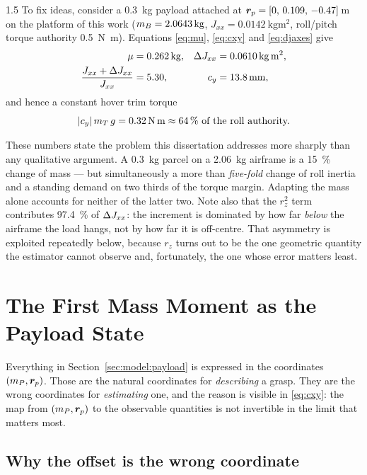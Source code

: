 \begin{spacing}{1.5}
To fix ideas, consider a \SI{0.3}{\kg} payload attached at
$\bm{r}_p = [0,\, 0.109,\, -0.47]\,$\si{\meter} on the platform of this work
($\mB = \SI{2.0643}{\kg}$, $J_{xx} = \SI{0.0142}{\kg\meter\squared}$, roll/pitch
torque authority \SI{0.5}{\newton\meter}). Equations \eqref{eq:mu},
\eqref{eq:cxy} and \eqref{eq:djaxes} give
\begin{align}
\mu &= \SI{0.262}{\kg}, &
\dJ_{xx} &= \SI{0.0610}{\kg\meter\squared}, \nonumber \\
\frac{J_{xx} + \dJ_{xx}}{J_{xx}} &= 5.30, &
c_y &= \SI{13.8}{\milli\meter},
\label{eq:numbers}
\end{align}
and hence a constant hover trim torque
\begin{equation}
|c_y|\, m_T\, g = \SI{0.32}{\newton\meter} \approx \SI{64}{\percent}\ \text{of the roll authority.}
\label{eq:trimtorque}
\end{equation}

These numbers state the problem this dissertation addresses more sharply than any
qualitative argument. A \SI{0.3}{\kg} parcel on a \SI{2.06}{\kg} airframe is a
\SI{15}{\percent} change of mass --- but simultaneously a more than
\emph{five-fold} change of roll inertia and a standing demand on two thirds of
the torque margin. Adapting the mass alone accounts for neither of the latter
two. Note also that the $r_z^2$ term contributes \SI{97.4}{\percent} of
$\Delta J_{xx}$: the increment is dominated by how far \emph{below} the airframe the
load hangs, not by how far it is off-centre. That asymmetry is exploited
repeatedly below, because $r_z$ turns out to be the one geometric quantity the
estimator cannot observe and, fortunately, the one whose error matters least.

\section{The First Mass Moment as the Payload State}\label{sec:model:moment}

Everything in Section~\ref{sec:model:payload} is expressed in the coordinates
$(m_P, \bm{r}_p)$. Those are the natural coordinates for \emph{describing} a grasp.
They are the wrong coordinates for \emph{estimating} one, and the reason is
visible in \eqref{eq:cxy}: the map from $(m_P,\bm{r}_p)$ to the observable quantities
is not invertible in the limit that matters most.

\subsection{Why the offset is the wrong coordinate}\label{sec:model:whyS}


\end{spacing}
